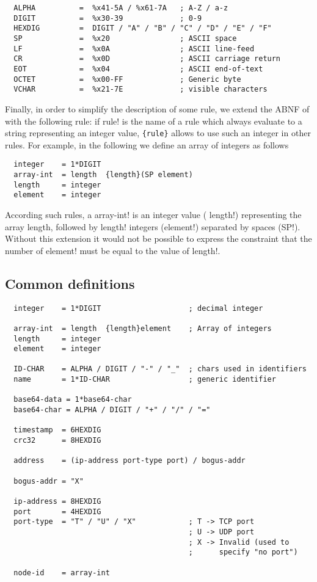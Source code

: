 \documentclass{medusabook}
\begin{document}
\begin{verbatim}
  ALPHA          =  %x41-5A / %x61-7A   ; A-Z / a-z
  DIGIT          =  %x30-39             ; 0-9
  HEXDIG         =  DIGIT / "A" / "B" / "C" / "D" / "E" / "F"
  SP             =  %x20                ; ASCII space
  LF             =  %x0A                ; ASCII line-feed
  CR             =  %x0D                ; ASCII carriage return
  EOT            =  %x04                ; ASCII end-of-text
  OCTET          =  %x00-FF             ; Generic byte
  VCHAR          =  %x21-7E             ; visible characters
\end{verbatim}
%
Finally, in order to simplify the description of some rule, we extend
the ABNF of \cite{rfc5234} with the following rule: if \ttt rule! is
the name of a rule which always evaluate to a string representing an
integer value, \verb-{rule}- allows to use such an integer in other
rules. For example, in the following we define an array of integers as
follows

\begin{verbatim}
  integer    = 1*DIGIT
  array-int  = length  {length}(SP element)
  length     = integer
  element    = integer
\end{verbatim}
%
According such rules, a \ttt array-int! is an integer value (\ttt
length!) representing the array length, followed by \ttt length!
integers (\ttt element!) separated by spaces (\ttt SP!). Without this
extension it would not be possible to express the constraint that the
number of \ttt element! must be equal to the value of \ttt length!.

\subsection{Common definitions}
\label{sub:1.3.3;medusa_book}

\begin{verbatim}
  integer    = 1*DIGIT                    ; decimal integer

  array-int  = length  {length}element    ; Array of integers
  length     = integer
  element    = integer

  ID-CHAR    = ALPHA / DIGIT / "-" / "_"  ; chars used in identifiers
  name       = 1*ID-CHAR                  ; generic identifier

  base64-data = 1*base64-char
  base64-char = ALPHA / DIGIT / "+" / "/" / "="

  timestamp  = 6HEXDIG
  crc32      = 8HEXDIG

  address    = (ip-address port-type port) / bogus-addr

  bogus-addr = "X"

  ip-address = 8HEXDIG
  port       = 4HEXDIG
  port-type  = "T" / "U" / "X"            ; T -> TCP port
                                          ; U -> UDP port
                                          ; X -> Invalid (used to 
                                          ;      specify "no port")

  node-id    = array-int
\end{verbatim}
\end{document}
